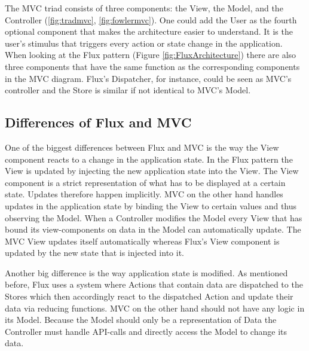 The MVC triad consists of three components: the View, the Model, and the Controller (\ref{fig:tradmvc}, \ref{fig:fowlermvc}). One could add the User as the fourth optional component that makes the architecture easier to understand. It is the user's stimulus that triggers every action or state change in the application. When looking at the Flux pattern (Figure \ref{fig:FluxArchitecture}) there are also three components that have the same function as the corresponding components in the MVC diagram. Flux's Dispatcher, for instance, could be seen as MVC's controller and the Store is similar if not identical to MVC's Model.


\subsection{Differences of Flux and MVC}

One of the biggest differences between Flux and MVC is the way the View component reacts to a change in the application state. In the Flux pattern the View is updated by injecting the new application state into the View. The View component is a strict representation of what has to be displayed at a certain state. Updates therefore happen implicitly. MVC on the other hand handles updates in the application state by binding the View to certain values and thus observing the Model. When a Controller modifies the Model every View that has bound its view-components on data in the Model can automatically update. The MVC View updates itself automatically whereas Flux's View component is updated by the new state that is injected into it.

Another big difference is the way application state is modified. As mentioned before, Flux uses a system where Actions that contain data are dispatched to the Stores which then accordingly react to the dispatched Action and update their data via reducing functions. MVC on the other hand should not have any logic in its Model. Because the Model should only be a representation of Data the Controller must handle API-calls and directly access the Model to change its data.


